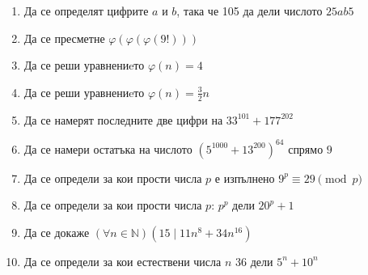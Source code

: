 \documentclass[12pt]{article}
\begin{document}
\begin{enumerate}
    \item Да се определят цифрите \(a\) и \(b\), така че 105 да дели числото \(25ab5\)
    \item Да се пресметне \(\varphi(\varphi(\varphi(9!)))\)
    \item Да се реши уравнениeто \(\varphi(n) = 4\)
    \item Да се реши уравнениeто \(\varphi(n) = \displaystyle\frac{3}{2}n\)
    \item Да се намерят последните две цифри на \(33^{101} + 177^{202}\)
    \item Да се намери остатъка на числото \((5^{1000} + 13^{200})^{64}\) спрямо \(9\)
    \item Да се определи за кои прости числа \(p\) е изпълнено \(9^p \equiv 29 \pmod{p}\)
    \item Да се определи за кои прости числа \(p\): \(p^p\) дели \(20^p + 1\)
    \item Да се докаже \((\forall n \in \mathbb{N})(15 \mid 11n^8 + 34n^{16} )\)
    \item Да се определи за кои естествени числа \(n\) \(36\) дели \(5^n + 10^n\)
\end{enumerate}
\end{document}
